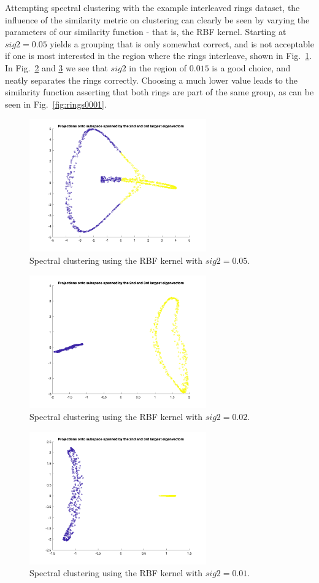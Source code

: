 \documentclass[10pt,a4paper]{article}
\begin{document}
Attempting spectral clustering with the example interleaved rings dataset, the influence of the similarity metric on clustering can clearly be seen by varying the parameters of our similarity function - that is, the RBF kernel. Starting at $sig2=0.05$ yields a grouping that is only somewhat correct, and is not acceptable if one is most interested in the region where the rings interleave, shown in Fig.~\ref{fig:rings005}. In Fig.~\ref{fig:rings002} and \ref{fig:rings001} we see that $sig2$ in the region of $0.015$ is a good choice, and neatly separates the rings correctly. Choosing a much lower value leads to the similarity function asserting that both rings are part of the same group, as can be seen in Fig.~\ref{fig:rings0001}.

\begin{figure}[h!]
\centering
  \includegraphics[width=3in]{rings005.png}
  \caption{Spectral clustering using the RBF kernel with $sig2=0.05$.}
  \label{fig:rings005}
\end{figure}

\begin{figure}[h!]
\centering
  \includegraphics[width=3in]{rings002.png}
  \caption{Spectral clustering using the RBF kernel with $sig2=0.02$.}
  \label{fig:rings002}
\end{figure}

\begin{figure}[h!]
\centering
  \includegraphics[width=3in]{rings001.png}
  \caption{Spectral clustering using the RBF kernel with $sig2=0.01$.}
  \label{fig:rings001}
\end{figure}
\end{document}
